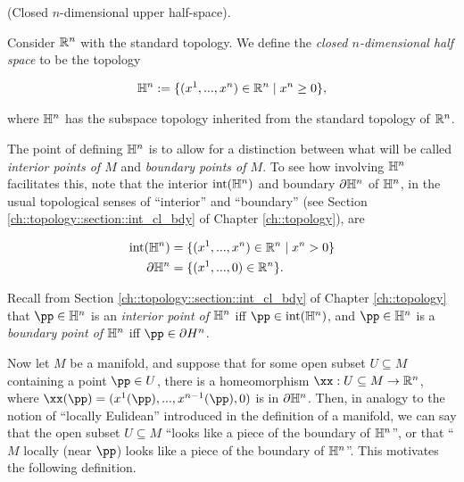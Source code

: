 \begin{defn}
     (Closed $n$-dimensional upper half-space). 
    
    Consider $\mathbb{R}^n$ with the standard topology. We define the \textit{closed $n$-dimensional half space} to be the topology
    
    \begin{align*}
        \mathbb{H}^n := \{ (x^1, ..., x^n) \in \mathbb{R}^n \mid x^n \geq 0 \},
    \end{align*}
    
    where $\mathbb{H}^n$ has the subspace topology inherited from the standard topology of $\mathbb{R}^n$.
    
    The point of defining $\mathbb{H}^n$ is to allow for a distinction between what will be called \textit{interior points of $M$} and \textit{boundary points of $M$}. To see how involving $\mathbb{H}^n$ facilitates this, note that the interior $\text{int}(\mathbb{H}^n)$ and boundary $\partial \mathbb{H}^n$ of $\mathbb{H}^n$, in the usual topological senses of ``interior'' and ``boundary'' (see Section \ref{ch::topology::section::int_cl_bdy} of Chapter \ref{ch::topology}), are
    
    \begin{align*}
        \text{int}(\mathbb{H}^n) &= \{(x^1, ..., x^n) \in \mathbb{R}^n \mid x^n > 0\} \\
        \partial \mathbb{H}^n &= \{(x^1, ..., 0) \in \mathbb{R}^n \}.
    \end{align*}
    
    Recall from Section \ref{ch::topology::section::int_cl_bdy} of Chapter \ref{ch::topology} that $\pp \in \H^n$ is an \textit{interior point of $\mathbb{H}^n$} iff $\pp \in \iint(\H^n)$, and $\pp \in \H^n$ is a \textit{boundary point of $\mathbb{H}^n$} iff $\pp \in \pd H^n$.
\end{defn}

Now let $M$ be a manifold, and suppose that for some open subset $U \subseteq M$ containing a point $\pp \in U$, there is a homeomorphism $\xx:U \subseteq M \rightarrow \R^n$, where $\xx(\pp) = (x^1(\pp), ..., x^{n - 1}(\pp), 0)$ is in $\partial \mathbb{H}^n$. Then, in analogy to the notion of ``locally Eulidean'' introduced in the definition of a manifold, we can say that the open subset $U \subseteq M$ ``looks like a piece of the boundary of $\mathbb{H}^n$'', or that ``$M$ locally (near $\pp$) looks like a piece of the boundary of $\mathbb{H}^n$''. This motivates the following definition.

